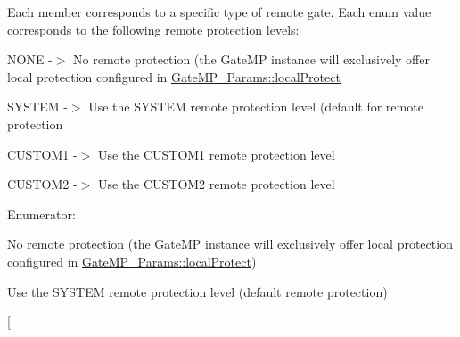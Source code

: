 Each member corresponds to a specific type of remote gate. Each enum value corresponds to the following remote protection levels\-:
\begin{DoxyItemize}
\item N\-O\-N\-E -\/$>$ No remote protection (the Gate\-M\-P instance will exclusively offer local protection configured in \hyperlink{struct_gate_m_p___params_ac080433fff177b3d5b1cd5dcafc9e28c}{Gate\-M\-P\-\_\-\-Params\-::local\-Protect}
\item S\-Y\-S\-T\-E\-M -\/$>$ Use the S\-Y\-S\-T\-E\-M remote protection level (default for remote protection
\item C\-U\-S\-T\-O\-M1 -\/$>$ Use the C\-U\-S\-T\-O\-M1 remote protection level
\item C\-U\-S\-T\-O\-M2 -\/$>$ Use the C\-U\-S\-T\-O\-M2 remote protection level 
\end{DoxyItemize}\begin{Desc}
\item[Enumerator\-: ]\par
\begin{description}
\item[{\em 
Gate\-M\-P\-\_\-\-Remote\-Protect\-\_\-\-N\-O\-N\-E\label{_gate_m_p_8h_a88716d5706d8fa8c6a3b9a4f023ef1d8a29b87b5258dbf5e387fc5a4ada3548ab}
}]No remote protection (the Gate\-M\-P instance will exclusively offer local protection configured in \hyperlink{struct_gate_m_p___params_ac080433fff177b3d5b1cd5dcafc9e28c}{Gate\-M\-P\-\_\-\-Params\-::local\-Protect}) \item[{\em 
Gate\-M\-P\-\_\-\-Remote\-Protect\-\_\-\-S\-Y\-S\-T\-E\-M\label{_gate_m_p_8h_a88716d5706d8fa8c6a3b9a4f023ef1d8aba4e153ee33cce1d32dc84254261c557}
}]Use the S\-Y\-S\-T\-E\-M remote protection level (default remote protection) \item[{\em 
}
\end{description}
\end{Desc}
